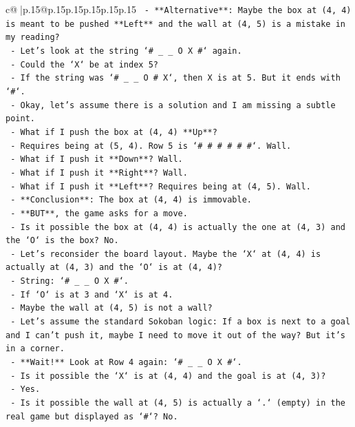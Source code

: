 \documentclass{article}
\begin{document}
{\begin{supertabular}{c@{$\;$}|p{.15\linewidth}@{}p{.15\linewidth}p{.15\linewidth}p{.15\linewidth}p{.15\linewidth}p{.15\linewidth}}
{{{\texttt{    {-}   **Alternative**: Maybe the box at (4, 4) is meant to be pushed **Left** and the wall at (4, 5) is a mistake in my reading?} \\
\texttt{    {-}   Let's look at the string `\# \_ \_ O X \#` again.} \\
\texttt{    {-}   Could the `X` be at index 5?} \\
\texttt{    {-}   If the string was `\# \_ \_ O \# X`, then X is at 5. But it ends with `\#`.} \\
\texttt{    {-}   Okay, let's assume there is a solution and I am missing a subtle point.} \\
\texttt{    {-}   What if I push the box at (4, 4) **Up**?} \\
\texttt{        {-}   Requires being at (5, 4). Row 5 is `\# \# \# \# \# \#`. Wall.} \\
\texttt{    {-}   What if I push it **Down**? Wall.} \\
\texttt{    {-}   What if I push it **Right**? Wall.} \\
\texttt{    {-}   What if I push it **Left**? Requires being at (4, 5). Wall.} \\
\texttt{    {-}   **Conclusion**: The box at (4, 4) is immovable.} \\
\texttt{    {-}   **BUT**, the game asks for a move.} \\
\texttt{    {-}   Is it possible the box at (4, 4) is actually the one at (4, 3) and the `O` is the box? No.} \\
\texttt{    {-}   Let's reconsider the board layout. Maybe the `X` at (4, 4) is actually at (4, 3) and the `O` is at (4, 4)?} \\
\texttt{    {-}   String: `\# \_ \_ O X \#`.} \\
\texttt{    {-}   If `O` is at 3 and `X` is at 4.} \\
\texttt{    {-}   Maybe the wall at (4, 5) is not a wall?} \\
\texttt{    {-}   Let's assume the standard Sokoban logic: If a box is next to a goal and I can't push it, maybe I need to move it out of the way? But it's in a corner.} \\
\texttt{    {-}   **Wait!** Look at Row 4 again: `\# \_ \_ O X \#`.} \\
\texttt{    {-}   Is it possible the `X` is at (4, 4) and the goal is at (4, 3)?} \\
\texttt{    {-}   Yes.} \\
\texttt{    {-}   Is it possible the wall at (4, 5) is actually a `.` (empty) in the real game but displayed as `\#`? No.} \\
}}}
\end{supertabular}}
\end{document}
